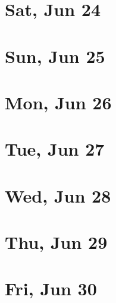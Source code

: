 	\section{Sat, Jun 24}
		
	\section{Sun, Jun 25}
		
	\section{Mon, Jun 26}
		
	\section{Tue, Jun 27}
		
	\section{Wed, Jun 28}
		
	\section{Thu, Jun 29}
		
	\section{Fri, Jun 30}
		
